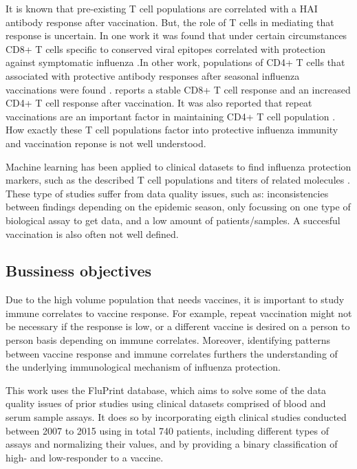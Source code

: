 It is known that pre-existing T cell populations are correlated with a HAI
antibody response after vaccination. But, the role of T cells in mediating that
response is uncertain. In one work it was found that under certain
circumstances CD8+ T cells specific to conserved viral epitopes correlated with
protection against symptomatic influenza
\citep{sridharCellularImmuneCorrelates2013}.In other work, populations of CD4+
T cells that associated with protective antibody responses after seasonal
influenza vaccinations were found \citep{bentebibelInductionICOSCXCR3}.
\cite{trieuLongtermMaintenanceInfluenzaSpecific2017} reports a stable CD8+ T
cell response and an increased CD4+ T cell response after vaccination. It was
also reported that repeat vaccinations are an important factor in maintaining
CD4+ T cell population \citep{trieuLongtermMaintenanceInfluenzaSpecific2017}.
How exactly these T cell populations factor into protective influenza immunity
and vaccination reponse is not well understood.

Machine learning has been applied to clinical datasets to find influenza
protection markers, such as the described T cell populations and titers of
related molecules \citep{furmanApoptosisOtherImmune2013,
sobolevAdjuvantedInfluenzaH1N1Vaccination2016, tsangGlobalAnalysesHuman2014}.
These type of studies suffer from data quality issues, such as: inconsistencies
between findings depending on the epidemic season, only focussing on one type
of biological assay to get data, and a low amount of patients/samples. A
succesful vaccination is also often not well defined.

\subsection{Bussiness objectives}

Due to the high volume population that needs vaccines, it is important to study
immune correlates to vaccine response. For example, repeat vaccination might
not be necessary if the response is low, or a different vaccine is desired on a
person to person basis depending on immune correlates. Moreover, identifying
patterns between vaccine response and immune correlates furthers the
understanding of the underlying immunological mechanism of influenza
protection.

This work uses the FluPrint database, which aims to solve some of the data
quality issues of prior studies using clinical datasets comprised of blood and
serum sample assays. It does so by incorporating eigth clinical studies
conducted between 2007 to 2015 using in total 740 patients, including different
types of assays and normalizing their values, and by providing a binary
classification of high- and low-responder to a vaccine.


